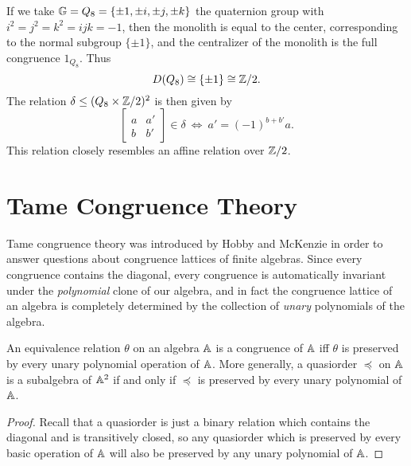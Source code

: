 \begin{appendices}
\begin{ex} If we take $\mathbb{G} = Q_8 = \{\pm 1, \pm i, \pm j, \pm k\}$ the quaternion group with $i^2 = j^2 = k^2 = ijk = -1$, then the monolith is equal to the center, corresponding to the normal subgroup $\{\pm 1\}$, and the centralizer of the monolith is the full congruence $1_{Q_8}$. Thus
\[
D(Q_8) \cong \{\pm 1\} \cong \mathbb{Z}/2.
\]
The relation $\delta \le (Q_8 \times \mathbb{Z}/2)^2$ is then given by
\[
\begin{bmatrix} a & a'\\ b & b'\end{bmatrix} \in \delta\ \iff\ a' = (-1)^{b + b'}a.
\]
This relation closely resembles an affine relation over $\mathbb{Z}/2$.
\end{ex}






\chapter{Tame Congruence Theory}\label{a-tct}

Tame congruence theory was introduced by Hobby and McKenzie \cite{hobby-mckenzie} in order to answer questions about congruence lattices of finite algebras. Since every congruence contains the diagonal, every congruence is automatically invariant under the \emph{polynomial} clone of our algebra, and in fact the congruence lattice of an algebra is completely determined by the collection of \emph{unary} polynomials of the algebra.

\begin{prop}\label{prop-quasiorder-poly} An equivalence relation $\theta$ on an algebra $\mathbb{A}$ is a congruence of $\mathbb{A}$ iff $\theta$ is preserved by every unary polynomial operation of $\mathbb{A}$. More generally, a quasiorder $\preceq$ on $\mathbb{A}$ is a subalgebra of $\mathbb{A}^2$ if and only if $\preceq$ is preserved by every unary polynomial of $\mathbb{A}$.
\end{prop}
\begin{proof} Recall that a quasiorder is just a binary relation which contains the diagonal and is transitively closed, so any quasiorder which is preserved by every basic operation of $\mathbb{A}$ will also be preserved by any unary polynomial of $\mathbb{A}$.


\end{proof}
\end{appendices}
